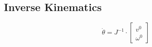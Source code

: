 \subsection{Inverse Kinematics}
    \vspace{-0.5em}
    $$
        \dot{\theta} = J^{-1} \cdot 
            \begin{bmatrix}
                v^0 \\ \omega^0
            \end{bmatrix}
    $$